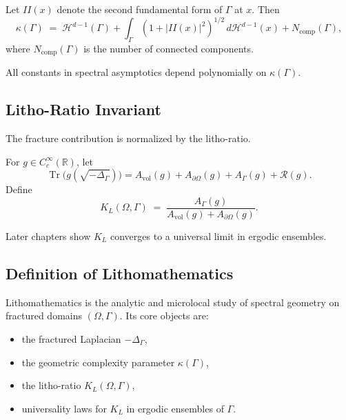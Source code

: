 \begin{definition}
Let $II(x)$ denote the second fundamental form of $\Gamma$ at $x$. Then
\[
\kappa(\Gamma) \;=\;
\mathcal{H}^{d-1}(\Gamma)
+ \int_\Gamma (1+|II(x)|^2)^{1/2}\, d\mathcal{H}^{d-1}(x)
+ N_{\mathrm{comp}}(\Gamma),
\]
where $N_{\mathrm{comp}}(\Gamma)$ is the number of connected components.
\end{definition}

All constants in spectral asymptotics depend polynomially on $\kappa(\Gamma)$.

\subsection{Litho-Ratio Invariant}

The fracture contribution is normalized by the litho-ratio.

\begin{definition}
For $g \in C_c^\infty(\mathbb{R})$, let
\[
\operatorname{Tr}\!\bigl(g(\sqrt{-\Delta_\Gamma})\bigr)
= A_{\mathrm{vol}}(g)+A_{\partial\Omega}(g)+A_\Gamma(g)+\mathcal{R}(g).
\]
Define
\[
K_L(\Omega,\Gamma) \;=\;
\frac{A_\Gamma(g)}{A_{\mathrm{vol}}(g)+A_{\partial\Omega}(g)}.
\]
\end{definition}

Later chapters show $K_L$ converges to a universal limit in ergodic ensembles.

\subsection{Definition of Lithomathematics}

\begin{definition}[Lithomathematics]
Lithomathematics is the analytic and microlocal study of spectral geometry on
fractured domains $(\Omega,\Gamma)$. Its core objects are:
\begin{itemize}
  \item the fractured Laplacian $-\Delta_\Gamma$,
  \item the geometric complexity parameter $\kappa(\Gamma)$,
  \item the litho-ratio $K_L(\Omega,\Gamma)$,
  \item universality laws for $K_L$ in ergodic ensembles of $\Gamma$.
\end{itemize}
\end{definition}

